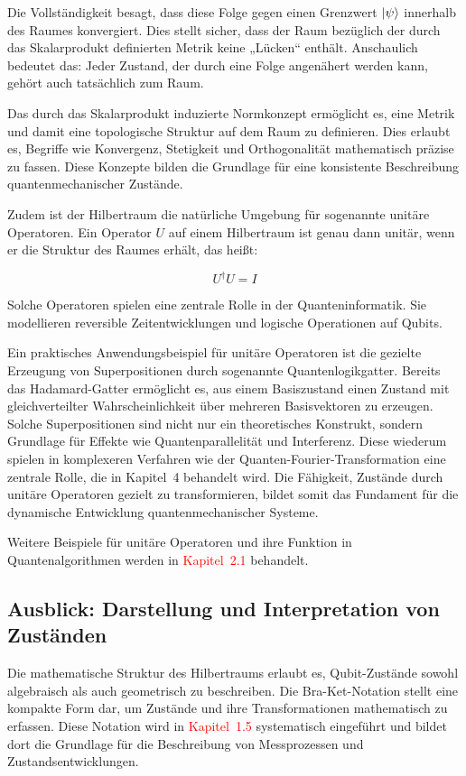 Die Vollständigkeit besagt, dass diese Folge gegen einen Grenzwert \( \ket{\psi} \) innerhalb des Raumes konvergiert. Dies stellt sicher, dass der Raum bezüglich der durch das Skalarprodukt definierten Metrik keine „Lücken“ enthält. Anschaulich bedeutet das: Jeder Zustand, der durch eine Folge angenähert werden kann, gehört auch tatsächlich zum Raum.

Das durch das Skalarprodukt induzierte Normkonzept ermöglicht es, eine Metrik und damit eine topologische Struktur auf dem Raum zu definieren. Dies erlaubt es, Begriffe wie Konvergenz, Stetigkeit und Orthogonalität mathematisch präzise zu fassen. Diese Konzepte bilden die Grundlage für eine konsistente Beschreibung quantenmechanischer Zustände.

Zudem ist der Hilbertraum die natürliche Umgebung für sogenannte unitäre Operatoren. Ein Operator \( U \) auf einem Hilbertraum ist genau dann unitär, wenn er die Struktur des Raumes erhält, das heißt:

\[
U^\dagger U = I
\]

Solche Operatoren spielen eine zentrale Rolle in der Quanteninformatik. Sie modellieren reversible Zeitentwicklungen und logische Operationen auf Qubits.

Ein praktisches Anwendungsbeispiel für unitäre Operatoren ist die gezielte Erzeugung von Superpositionen durch sogenannte Quantenlogikgatter. Bereits das Hadamard-Gatter ermöglicht es, aus einem Basiszustand einen Zustand mit gleichverteilter Wahrscheinlichkeit über mehreren Basisvektoren zu erzeugen. Solche Superpositionen sind nicht nur ein theoretisches Konstrukt, sondern Grundlage für Effekte wie Quantenparallelität und Interferenz. Diese wiederum spielen in komplexeren Verfahren wie der Quanten-Fourier-Transformation eine zentrale Rolle, die in Kapitel~4 behandelt wird. Die Fähigkeit, Zustände durch unitäre Operatoren gezielt zu transformieren, bildet somit das Fundament für die dynamische Entwicklung quantenmechanischer Systeme.

Weitere Beispiele für unitäre Operatoren und ihre Funktion in Quantenalgorithmen werden in  \textcolor{red}{Kapitel~2.1} behandelt.

\subsection{Ausblick: Darstellung und Interpretation von Zuständen}

Die mathematische Struktur des Hilbertraums erlaubt es, Qubit-Zustände sowohl algebraisch als auch geometrisch zu beschreiben. Die Bra-Ket-Notation stellt eine kompakte Form dar, um Zustände und ihre Transformationen mathematisch zu erfassen. Diese Notation wird in  \textcolor{red} {Kapitel~1.5} systematisch eingeführt und bildet dort die Grundlage für die Beschreibung von Messprozessen und Zustandsentwicklungen.

